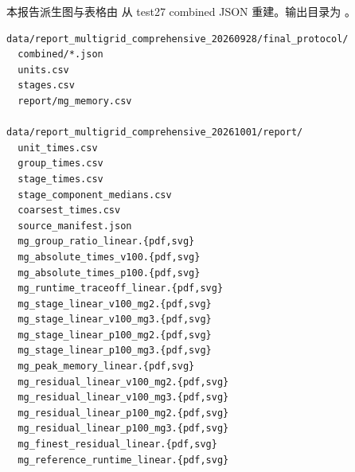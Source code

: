\documentclass[UTF8,a4paper,11pt]{ctexart}
\begin{document}
本报告派生图与表格由
从 test27 combined JSON 重建。输出目录为
。

\begin{verbatim}
data/report_multigrid_comprehensive_20260928/final_protocol/
  combined/*.json
  units.csv
  stages.csv
  report/mg_memory.csv

data/report_multigrid_comprehensive_20261001/report/
  unit_times.csv
  group_times.csv
  stage_times.csv
  stage_component_medians.csv
  coarsest_times.csv
  source_manifest.json
  mg_group_ratio_linear.{pdf,svg}
  mg_absolute_times_v100.{pdf,svg}
  mg_absolute_times_p100.{pdf,svg}
  mg_runtime_traceoff_linear.{pdf,svg}
  mg_stage_linear_v100_mg2.{pdf,svg}
  mg_stage_linear_v100_mg3.{pdf,svg}
  mg_stage_linear_p100_mg2.{pdf,svg}
  mg_stage_linear_p100_mg3.{pdf,svg}
  mg_peak_memory_linear.{pdf,svg}
  mg_residual_linear_v100_mg2.{pdf,svg}
  mg_residual_linear_v100_mg3.{pdf,svg}
  mg_residual_linear_p100_mg2.{pdf,svg}
  mg_residual_linear_p100_mg3.{pdf,svg}
  mg_finest_residual_linear.{pdf,svg}
  mg_reference_runtime_linear.{pdf,svg}
\end{verbatim}
\end{document}
